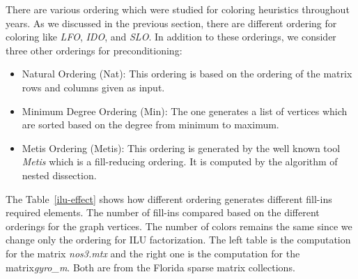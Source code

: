 \documentclass[12pt, oneside]{book}
\begin{document}
There are various ordering which were studied for coloring heuristics
throughout years. 
As we discussed in the previous section, there are different ordering for coloring
like \textit{LFO}, \textit{IDO}, and \textit{SLO}.
In addition to these orderings, we consider three other orderings for preconditioning:
\begin{itemize}
\item Natural Ordering (Nat): This ordering is based on the ordering of the matrix rows and columns given as input.
\item Minimum Degree Ordering (Min): The one generates a list of vertices which are sorted based on the degree from minimum to maximum.
\item Metis Ordering\cite{metis,par-nested-disection} (Metis): This ordering is generated by the well known
tool \textit{Metis} which is a fill-reducing ordering. It is computed by the algorithm of nested dissection.
\end{itemize}
The Table~\ref{ilu-effect} shows how different ordering generates different fill-ins required elements.
The number of fill-ins compared based on the different orderings
for the graph vertices. The number of colors remains the same since we change only the ordering for
ILU factorization.
The left table is the computation for the matrix \textit{nos3.mtx} 
and the right one is the computation for the matrix\textit{gyro\_m}.
Both are from the Florida sparse matrix collections.
\end{document}
